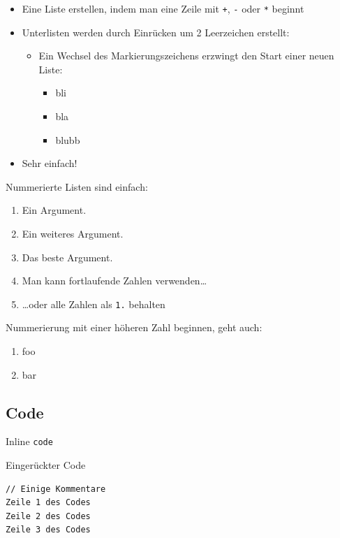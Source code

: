 \documentclass[
  doc,floatsintext]{apa7}
\providecommand{\tightlist}{%
  \setlength{\itemsep}{0pt}\setlength{\parskip}{0pt}}
\begin{document}
\begin{itemize}
\tightlist
\item
  Eine Liste erstellen, indem man eine Zeile mit \texttt{+}, \texttt{-} oder \texttt{*} beginnt
\item
  Unterlisten werden durch Einrücken um 2 Leerzeichen erstellt:

  \begin{itemize}
  \tightlist
  \item
    Ein Wechsel des Markierungszeichens erzwingt den Start einer neuen Liste:

    \begin{itemize}
    \tightlist
    \item
      bli
    \item
      bla
    \item
      blubb
    \end{itemize}
  \end{itemize}
\item
  Sehr einfach!
\end{itemize}

Nummerierte Listen sind einfach:

\begin{enumerate}
\def\labelenumi{\arabic{enumi}.}
\item
  Ein Argument.
\item
  Ein weiteres Argument.
\item
  Das beste Argument.
\item
  Man kann fortlaufende Zahlen verwenden\ldots{}
\item
  \ldots oder alle Zahlen als \texttt{1.} behalten
\end{enumerate}

Nummerierung mit einer höheren Zahl beginnen, geht auch:

\begin{enumerate}
\def\labelenumi{\arabic{enumi}.}
\setcounter{enumi}{56}
\tightlist
\item
  foo
\item
  bar
\end{enumerate}

\hypertarget{code}{%
\subsection{Code}\label{code}}

Inline \texttt{code}

Eingerückter Code

\begin{verbatim}
// Einige Kommentare
Zeile 1 des Codes
Zeile 2 des Codes
Zeile 3 des Codes
\end{verbatim}
\end{document}
